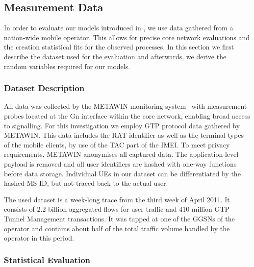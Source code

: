 \subsection{Measurement Data}\label{sec:cloud:virtualized_network_functions:measurement_data}

In order to evaluate our models introduced in , we use data gathered from a nation-wide mobile operator.
This allows for precise core network evaluations and the creation statistical fits for the observed processes.
In this section we first describe the dataset used for the evaluation and afterwards, we derive the random variables required for our models.

\subsubsection*{Dataset Description}\label{sec:cloud:virtualized_network_functions:measurement_data:description}

\label{sec:dataset_description}

All data was collected by the \gls{METAWIN} monitoring system~\cite{Ricciato2006} with measurement probes located at the Gn interface within the core network, enabling broad access to signalling.
For this investigation we employ \gls{GTP} protocol data gathered by \gls{METAWIN}.
This data includes the \gls{RAT} identifier as well as the terminal types of the mobile clients, by use of the \gls{TAC} part of the \gls{IMEI}.
To meet privacy requirements, \gls{METAWIN} anonymises all captured data.
The application-level payload is removed and all user identifiers are hashed with one-way functions before data storage.
Individual \glspl{UE} in our dataset can be differentiated by the hashed \gls{MS-ID}, but not traced back to the actual user.

The used dataset is a week-long trace from the third week of April 2011.
It consists of \(2.2\) billion aggregated flows for user traffic and \(410\) million \gls{GTP} Tunnel Management transactions.
It was tapped at one of the \glspl{GGSN} of the operator and contains about half of the total traffic volume handled by the operator in this period.

\subsubsection*{Statistical Evaluation}\label{sec:cloud:virtualized_network_functions:measurement_data:evaluation}

